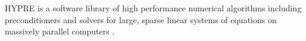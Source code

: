 
HYPRE is a software library of high performance numerical algorithms including preconditioners and solvers for large, sparse linear systems of equations on massively parallel computers \cite{Falgout2006TheDA}. 

\cite{10.5555/1125403.1125423}